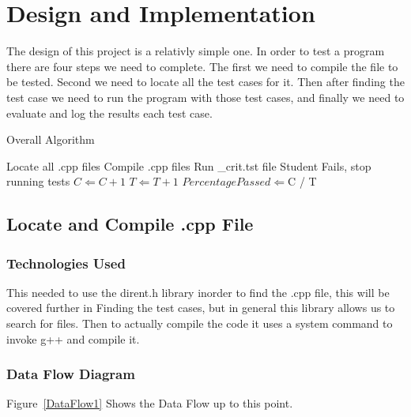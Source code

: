 \chapter{Design  and Implementation}
The design of this project is a relativly simple one.  In order to test a program there are four steps we need to complete.
The first we need to compile the file to be tested.  Second we need to locate all the test cases for it.  Then after finding the test case we need to run the program with those test cases, and finally we need to evaluate and log the results each test case.

\begin{algorithm} [tbh]              %
\caption{Overall Algorithm}
\label{algover}
\begin{algorithmic}
	\STATE Locate all .cpp files
	\STATE Compile .cpp files
		\STATE Run \_crit.tst file
				\STATE Student Fails, stop running tests
			\ENDIF
		\ENDIF
	\ENDWHILE
			\STATE $C \Leftarrow C + 1$
		\ENDIF
		\STATE $T \Leftarrow T + 1$
	\ENDWHILE
	\STATE $Percentage Passed \Leftarrow $C / T
\end{algorithmic}
\end{algorithm}
 

\section{Locate and Compile .cpp File}

\subsection{Technologies  Used}
This needed to use the dirent.h library inorder to find the .cpp file, this will be covered further in
Finding the test cases, but in general this library allows us to search for files.  Then to actually compile
the code it uses a system command to invoke g++ and compile it.

\subsection{Data Flow Diagram}
Figure~\ref{DataFlow1} Shows the Data Flow up to this point.


